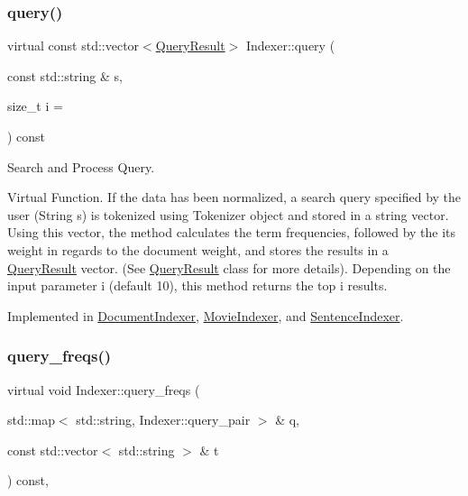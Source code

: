 \subsubsection{\texorpdfstring{query()}{query()}}
{\footnotesize\ttfamily virtual const std\+::vector$<$\hyperlink{class_query_result}{Query\+Result}$>$ Indexer\+::query (\begin{DoxyParamCaption}\item[{const std\+::string \&}]{s,  }\item[{size\+\_\+t}]{i = {} }\end{DoxyParamCaption}) const\hspace{0.3cm}{\ttfamily [pure virtual]}}



Search and Process Query. 

Virtual Function. If the data has been normalized, a search query specified by the user (String s) is tokenized using Tokenizer object and stored in a string vector. Using this vector, the method calculates the term frequencies, followed by the its weight in regards to the document weight, and stores the results in a \hyperlink{class_query_result}{Query\+Result} vector. (See \hyperlink{class_query_result}{Query\+Result} class for more details). Depending on the input parameter i (default 10), this method returns the top i results. 

Implemented in \hyperlink{class_document_indexer_af14be24c72be4b3eb165da9c504ec7d1}{Document\+Indexer}, \hyperlink{class_movie_indexer_a06225f4ac31f12e8ed253d0d2682d07a}{Movie\+Indexer}, and \hyperlink{class_sentence_indexer_acc4165c39f2193050d207861936927a7}{Sentence\+Indexer}.

\mbox{\label{class_indexer_a0587f6a4d61620219473bf583ecdbad5}} 
\subsubsection{\texorpdfstring{query\+\_\+freqs()}{query\_freqs()}}
{\footnotesize\ttfamily virtual void Indexer\+::query\+\_\+freqs (\begin{DoxyParamCaption}\item[{std\+::map$<$ std\+::string, Indexer\+::query\+\_\+pair $>$ \&}]{q,  }\item[{const std\+::vector$<$ std\+::string $>$ \&}]{t }\end{DoxyParamCaption}) const\hspace{0.3cm}{\ttfamily [protected]}, {}}



